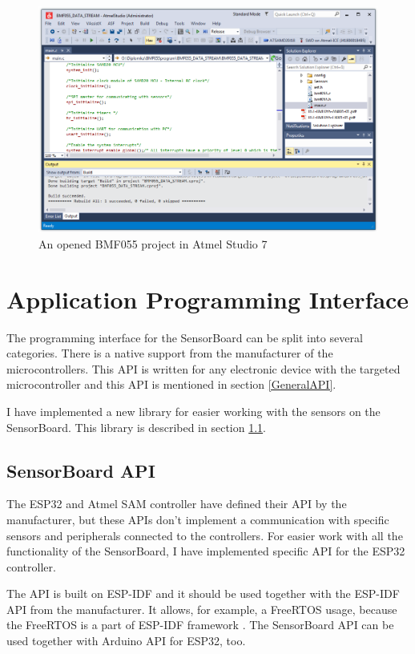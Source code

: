 \begin{figure}
	\centering
	\label{BMF055AtmelStudio}
	\caption{An opened BMF055 project in Atmel Studio 7}
	\includegraphics[width=16cm]{img/BMF055AtmelStudio.png}
\end{figure}

\section{Application Programming Interface}
The programming interface for the SensorBoard can be split into several categories. There is a native support from the manufacturer of the microcontrollers. This API is written for any electronic device with the targeted microcontroller and this API is mentioned in section \ref{GeneralAPI}.

I have implemented a new library for easier working with the sensors on the SensorBoard. This library is described in section \ref{SensorBoardAPI}.

\subsection{SensorBoard API}
\label{SensorBoardAPI}
The ESP32 and Atmel SAM controller have defined their API by the manufacturer, but these APIs don't implement a communication with specific sensors and peripherals connected to the controllers. For easier work with all the functionality of the SensorBoard, I have implemented specific API for the ESP32 controller.

The API is built on ESP-IDF and it should be used together with the ESP-IDF API from the manufacturer. It allows, for example, a FreeRTOS usage, because the FreeRTOS is a part of ESP-IDF framework \cite{ESP32}. The SensorBoard API can be used together with Arduino API for ESP32, too.

